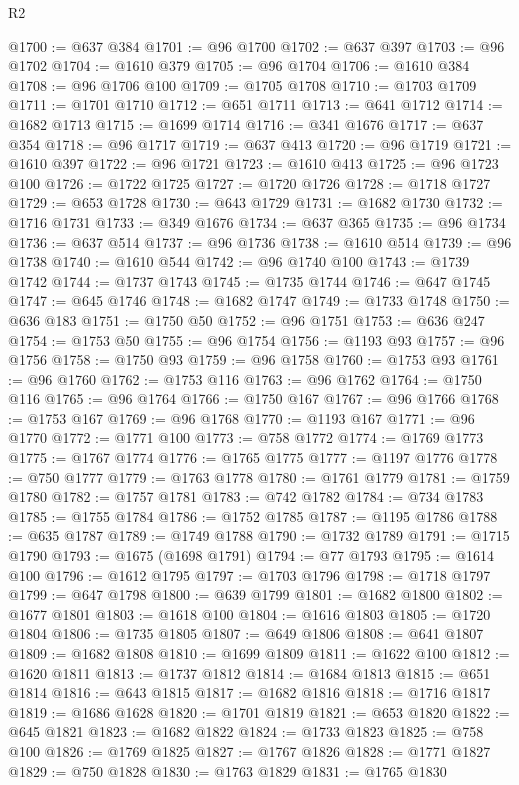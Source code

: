 \begin{lexlean}{R2}
\begin{coremodule}
@1700 := @637 @384
@1701 := @96 @1700
@1702 := @637 @397
@1703 := @96 @1702
@1704 := @1610 @379
@1705 := @96 @1704
@1706 := @1610 @384
@1708 := @96 @1706 @100
@1709 := @1705 @1708
@1710 := @1703 @1709
@1711 := @1701 @1710
@1712 := @651 @1711
@1713 := @641 @1712
@1714 := @1682 @1713
@1715 := @1699 @1714
@1716 := @341 @1676
@1717 := @637 @354
@1718 := @96 @1717
@1719 := @637 @413
@1720 := @96 @1719
@1721 := @1610 @397
@1722 := @96 @1721
@1723 := @1610 @413
@1725 := @96 @1723 @100
@1726 := @1722 @1725
@1727 := @1720 @1726
@1728 := @1718 @1727
@1729 := @653 @1728
@1730 := @643 @1729
@1731 := @1682 @1730
@1732 := @1716 @1731
@1733 := @349 @1676
@1734 := @637 @365
@1735 := @96 @1734
@1736 := @637 @514
@1737 := @96 @1736
@1738 := @1610 @514
@1739 := @96 @1738
@1740 := @1610 @544
@1742 := @96 @1740 @100
@1743 := @1739 @1742
@1744 := @1737 @1743
@1745 := @1735 @1744
@1746 := @647 @1745
@1747 := @645 @1746
@1748 := @1682 @1747
@1749 := @1733 @1748
@1750 := @636 @183
@1751 := @1750 @50
@1752 := @96 @1751
@1753 := @636 @247
@1754 := @1753 @50
@1755 := @96 @1754
@1756 := @1193 @93
@1757 := @96 @1756
@1758 := @1750 @93
@1759 := @96 @1758
@1760 := @1753 @93
@1761 := @96 @1760
@1762 := @1753 @116
@1763 := @96 @1762
@1764 := @1750 @116
@1765 := @96 @1764
@1766 := @1750 @167
@1767 := @96 @1766
@1768 := @1753 @167
@1769 := @96 @1768
@1770 := @1193 @167
@1771 := @96 @1770
@1772 := @1771 @100
@1773 := @758 @1772
@1774 := @1769 @1773
@1775 := @1767 @1774
@1776 := @1765 @1775
@1777 := @1197 @1776
@1778 := @750 @1777
@1779 := @1763 @1778
@1780 := @1761 @1779
@1781 := @1759 @1780
@1782 := @1757 @1781
@1783 := @742 @1782
@1784 := @734 @1783
@1785 := @1755 @1784
@1786 := @1752 @1785
@1787 := @1195 @1786
@1788 := @635 @1787
@1789 := @1749 @1788
@1790 := @1732 @1789
@1791 := @1715 @1790
@1793 := @1675 (@1698 @1791)
@1794 := @77 @1793
@1795 := @1614 @100
@1796 := @1612 @1795
@1797 := @1703 @1796
@1798 := @1718 @1797
@1799 := @647 @1798
@1800 := @639 @1799
@1801 := @1682 @1800
@1802 := @1677 @1801
@1803 := @1618 @100
@1804 := @1616 @1803
@1805 := @1720 @1804
@1806 := @1735 @1805
@1807 := @649 @1806
@1808 := @641 @1807
@1809 := @1682 @1808
@1810 := @1699 @1809
@1811 := @1622 @100
@1812 := @1620 @1811
@1813 := @1737 @1812
@1814 := @1684 @1813
@1815 := @651 @1814
@1816 := @643 @1815
@1817 := @1682 @1816
@1818 := @1716 @1817
@1819 := @1686 @1628
@1820 := @1701 @1819
@1821 := @653 @1820
@1822 := @645 @1821
@1823 := @1682 @1822
@1824 := @1733 @1823
@1825 := @758 @100
@1826 := @1769 @1825
@1827 := @1767 @1826
@1828 := @1771 @1827
@1829 := @750 @1828
@1830 := @1763 @1829
@1831 := @1765 @1830

\end{coremodule}
\end{lexlean}
